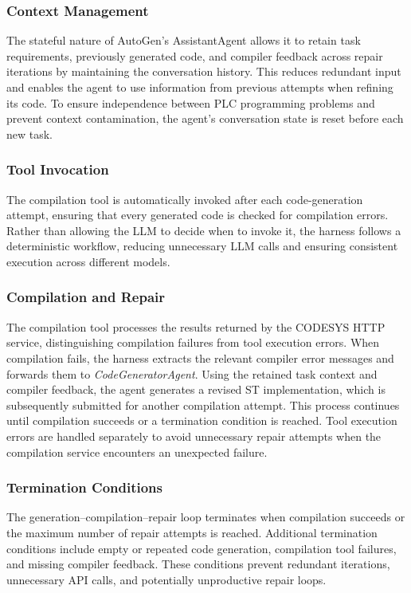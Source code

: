 \documentclass{article}
\begin{document}
\subsubsection{Context Management}

The stateful nature of AutoGen's AssistantAgent allows it to retain task requirements, previously generated code, and compiler feedback across repair iterations by maintaining the conversation history. This reduces redundant input and enables the agent to use information from previous attempts when refining its code. To ensure independence between PLC programming problems and prevent context contamination, the agent's conversation state is reset before each new task.

\subsubsection{Tool Invocation}

The compilation tool is automatically invoked after each code-generation attempt, ensuring that every generated code is checked for compilation errors. Rather than allowing the LLM to decide when to invoke it, the harness follows a deterministic workflow, reducing unnecessary LLM calls and ensuring consistent execution across different models.

\subsubsection{Compilation and Repair}

The compilation tool processes the results returned by the CODESYS HTTP service, distinguishing compilation failures from tool execution errors. When compilation fails, the harness extracts the relevant compiler error messages and forwards them to \textit{CodeGeneratorAgent}. Using the retained task context and compiler feedback, the agent generates a revised ST implementation, which is subsequently submitted for another compilation attempt. This process continues until compilation succeeds or a termination condition is reached. Tool execution errors are handled separately to avoid unnecessary repair attempts when the compilation service encounters an unexpected failure.

\subsubsection{Termination Conditions}

The generation–compilation–repair loop terminates when compilation succeeds or the maximum number of repair attempts is reached. Additional termination conditions include empty or repeated code generation, compilation tool failures, and missing compiler feedback. These conditions prevent redundant iterations, unnecessary API calls, and potentially unproductive repair loops.
\end{document}
